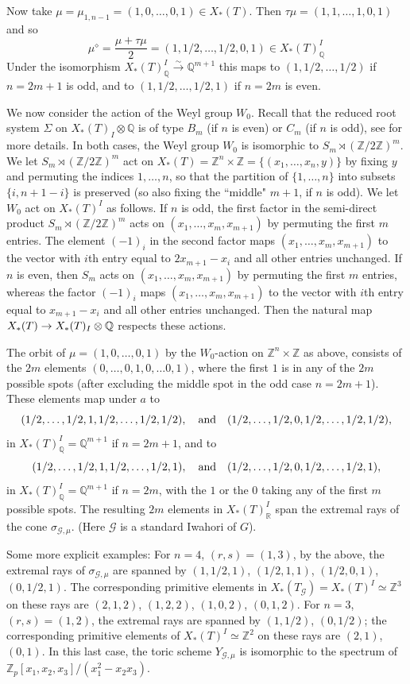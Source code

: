 \documentclass[reqno, 10pt]{amsart}
\makeatletter
\newcommand{\diam}{{\diamond}}
\newcommand{\BQ}{\ensuremath{\mathbb {Q}}\xspace}
\newcommand{\BR}{\ensuremath{\mathbb {R}}\xspace}
\newcommand{\BZ}{\ensuremath{\mathbb {Z}}\xspace}
\newcommand{\CG}{\ensuremath{\mathcal {G}}\xspace}
\theoremstyle{definition}
\numberwithin{equation}{subsection}
\numberwithin{subsubsection}{subsection}
\renewcommand{\to}{%
   \ifbool{@display}{\longrightarrow}{\rightarrow}%
   }
\makeatother
\begin{document}
Now take  $\mu=\mu_{1, n-1}=(1,0,\ldots ,0,1)\in X_*(T)$. Then $\tau\mu=(1,1,\ldots,1,0,1)$ and so 
\[
\mu^\diam=\frac{\mu+\tau\mu}{2}=(1,1/2,\ldots, 1/2,0,1)\in X_*(T)^I_\BQ
\]
Under the isomorphism $X_*(T)^I_\BQ\xrightarrow{\sim} \BQ^{m+1}$ this maps to $(1,1/2,\ldots, 1/2)$ if $n=2m+1$ is odd, and to
$(1,1/2,\ldots, 1/2, 1)$ if $n=2m$ is even. 

We now consider the action of the Weyl group $W_0$.  Recall that the reduced root system $\Sigma$ on $X_*(T)_I\otimes\BQ $ is of type $B_m$ (if $n$ is even) or $C_m$ (if $n$ is odd), see \cite{PRLM3} for more details. In both cases, the Weyl group $W_0$ is isomorphic to $S_m\rtimes (\BZ/2\BZ)^m$.
We let $S_m\rtimes (\BZ/2\BZ)^m$ act
on $X_*(T)=\BZ^n\times\BZ=\{(x_1,\ldots , x_n, y)\}$ by fixing $y$ and permuting the indices $1,\ldots , n$, so that  the partition of $\{1,\ldots , n\}$ into subsets $\{i, n+1-i\}$ is preserved (so also fixing the ``middle" $ m+1$, if $n$ is odd).  We let $W_0$ act on $X_*(T)^I$ as follows. If $n$ is odd, the first factor in the semi-direct product $S_m\rtimes (\BZ/2\BZ)^m$ acts on $(x_1, \ldots  ,x_m, x_{m+1})$ by permuting the first $m$ entries. The element $(-1)_i$ in the second factor maps $(x_1, \ldots  ,x_m, x_{m+1})$ to the vector with $i$th entry equal to $2x_{m+1}-x_i$ and all other entries unchanged. If $n$ is even, then $S_m$ acts on $(x_1, \ldots  ,x_m, x_{m+1})$ by permuting the first $m$ entries, whereas the factor $(-1)_i$ maps $(x_1, \ldots  ,x_m, x_{m+1})$ to the vector with $i$th entry equal to $x_{m+1}-x_i$ and all other entries unchanged.  Then the natural map $X_*(T) \to X_*(T)_I\otimes\BQ $ respects these actions. 

The orbit of $\mu=(1,0,\ldots ,0,1)$ by the $W_0$-action on $\BZ^n\times \BZ$ as above, consists of the $2m$ elements $(0,\ldots, 0,1,0,\ldots 0,1)$, where the first $1$ is in any of the $2m$ possible spots (after excluding the middle spot in the odd case $n=2m+1$). These elements map under $a$ to 
\[
(1/2,\ldots, 1/2, 1,1/2,\ldots, 1/2,1/2), \quad\hbox{\rm and}\quad (1/2,\ldots, 1/2, 0,1/2, \ldots, 1/2,1/2),
\]
 in $X_*(T)^I_\BQ=\BQ^{m+1}$ if $n=2m+1$, and to 
\[
(1/2,\ldots, 1/2, 1,1/2,\ldots, 1/2,1), \quad\hbox{\rm and}\quad (1/2,\ldots, 1/2, 0,1/2, \ldots, 1/2,1),
\]
 in $X_*(T)^I_\BQ=\BQ^{m+1}$ if $n=2m$,
with the   $1$ or the $0$ taking any of the first $m$ possible spots.  The resulting $2m$ elements in $X_*(T)^I_\BR$ span the extremal rays of the cone $\sigma_{\CG,\mu}$. (Here  $\CG$ is a standard Iwahori of $G$).  

Some more explicit examples: For $n=4$, $(r,s)=(1,3)$, by the above,  the extremal rays of $\sigma_{\CG,\mu}$ are spanned by
$(1,1/2,1)$, $(1/2,1,1)$,  $(1/2,0,1) $, $(0,1/2,1) $. The corresponding
primitive elements in $X_*(T_\CG)=X_*(T)^I\simeq \BZ^3$ on these rays are $(2,1 ,2 )$, $(1 ,2,2 )$,  $(1 ,0,2) $, $(0,1 ,2 ) $. For $n=3$, $(r,s)=(1,2)$, the extremal rays are spanned by $(1,1/2) $, $(0,1/2)$; the corresponding primitive elements of $X_*(T)^I\simeq \BZ^2$ on these rays are $(2,1)$, $(0,1)$.  
In this last case, the toric scheme $Y_{\CG,\mu}$ is isomorphic to the spectrum of 
$\BZ_p[x_1,x_2,x_3]/(x_1^2-x_2x_3)$. 
\end{document}
